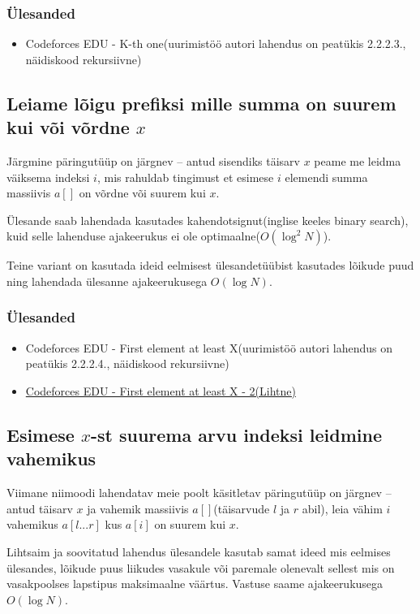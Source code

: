 \documentclass{trkut}
\theoremstyle{definition}
\begin{document}
\subsubsection{Ülesanded}
\begin{itemize}
    \item Codeforces EDU - K-th one(uurimistöö autori lahendus on peatükis 2.2.2.3., näidiskood rekursiivne)
\end{itemize}

\subsection{Leiame lõigu prefiksi mille summa on suurem kui või võrdne \texorpdfstring{$x$}{TEXT}}
Järgmine päringutüüp on järgnev -- antud sisendiks täisarv $x$ peame me leidma väiksema indeksi $i$, mis rahuldab tingimust et esimese $i$ elemendi summa massiivis $a[]$ on võrdne või suurem kui $x$.

Ülesande saab lahendada kasutades kahendotsignut(inglise keeles binary search), kuid selle lahenduse ajakeerukus ei ole optimaalne($O(\log^2 N)$)\parencite{usaco}.

Teine variant on kasutada ideid eelmisest ülesandetüübist kasutades lõikude puud ning lahendada ülesanne ajakeerukusega $O(\log N)$. \parencite{EMaxx}

\subsubsection{Ülesanded}
\begin{itemize}
    \item Codeforces EDU - First element at least X(uurimistöö autori lahendus on peatükis 2.2.2.4., näidiskood rekursiivne)
    \item  \href{https://codeforces.com/edu/course/2/lesson/4/2/practice/contest/273278/problem/D}{Codeforces EDU - First element at least X - 2(Lihtne)}
\end{itemize}
\subsection{Esimese \texorpdfstring{$x$}{TEXT}-st suurema arvu indeksi leidmine vahemikus}
Viimane niimoodi lahendatav meie poolt käsitletav päringutüüp on järgnev -- antud täisarv $x$ ja vahemik massiivis $a[]$(täisarvude $l$ ja $r$ abil), leia vähim $i$ vahemikus $a[l...r]$ kus $a[i]$ on suurem kui $x$. 

Lihtsaim ja soovitatud lahendus ülesandele kasutab samat ideed mis eelmises ülesandes, lõikude puus liikudes vasakule või paremale olenevalt sellest mis on vasakpoolses lapstipus maksimaalne väärtus. Vastuse saame ajakeerukusega $O(\log N)$. \parencite{EMaxx}
\end{document}
